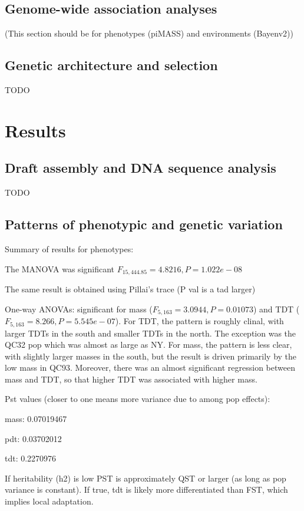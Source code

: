 \documentclass[fleqn,11pt]{wlpeerj}
\begin{document}
\subsection*{Genome-wide association analyses}
(This section should be for phenotypes (piMASS) and environments (Bayenv2))

\subsection*{Genetic architecture and selection}
TODO

\section*{Results}

\subsection*{Draft assembly and DNA sequence analysis}
TODO

\subsection*{Patterns of phenotypic and genetic variation}
Summary of results for phenotypes:

The MANOVA was significant $F_{15,444.85} = 4.8216, P = 1.022e-08$

The same result is obtained using Pillai's trace (P val is a tad larger)

One-way ANOVAs: significant for mass ($F_{5,163} = 3.0944, P = 0.01073$)
and TDT ($F_{5,163} = 8.266, P = 5.545e-07$). For TDT, the pattern is
roughly clinal, with larger TDTs in the south and smaller TDTs in the north.
The exception was the QC32 pop which was almost as large as NY.
For mass, the pattern is less clear, with slightly larger masses in the south,
but the result is driven primarily by the low mass in QC93. Moreover, there was
an almost significant regression between mass and TDT, so
that higher TDT was associated with higher mass.

Pst values (closer to one means more variance due to among pop effects):

mass: 0.07019467

pdt: 0.03702012

tdt: 0.2270976

If heritability (h2) is low PST is approximately QST or larger (as long as pop variance is constant).
If true, tdt is likely more differentiated than FST, which implies local adaptation.
\end{document}
